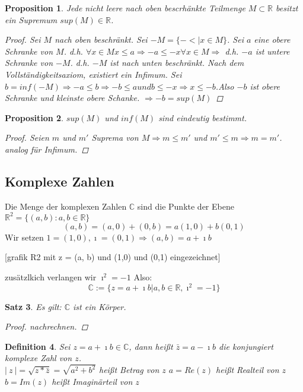 \documentclass[a4paper,titlepage,oneside]{article}
\def\C{\ensuremath{\mathbb{C}} }
\def\R{\ensuremath{\mathbb{R}} }
\def\im{\ensuremath{\imath} }
\newcommand{\fa}[1]{\ensuremath{\forall#1}}
\newcommand{\abs}[1]{\ensuremath{\left|\:#1\:\right|}}
\theoremstyle{thmstyle}
\newtheorem{satz}{Satz}[subsection]
\newtheorem{prop}[satz]{Proposition}
\newtheorem{defi}[satz]{Definition}
\begin{document}
\begin{prop}
Jede nicht leere nach oben bescrhänkte Teilmenge $M \subset \R$ besitzt ein Supremum $sup(M) \in \R$.
\begin{proof}
Sei $M$ nach oben beschränkt. Sei $-M = \{-< | x \in M\}$. Sei $a$ eine obere Schranke von $M$. d.h. $\fa x \in M  x \le a \Rightarrow -a \le -x \fa x \in M \Rightarrow $ d.h. $-a$ ist untere Schranke von $-M$. d.h. $-M$ ist nach unten beschränkt. Nach dem Vollständigkeitsaxiom, existiert ein Infimum. Sei $b= inf(-M) \Rightarrow -a \le b \Rightarrow -b \le a und b \le -x \Rightarrow x \le -b$.Also $-b$ ist obere Schranke und kleinste obere Schanke. $ \Rightarrow -b = sup(M)$ 
\end{proof}
\end{prop}

\begin{prop}
$sup(M)$ und $inf(M)$ sind eindeutig bestimmt.
\begin{proof}
Seien $m$ und $m'$ Suprema von $M \Rightarrow m \le m'$ und $m' \le m \Rightarrow m = m'$.\\
analog für Infimum.
\end{proof}
\end{prop}

\subsection{Komplexe Zahlen}
Die Menge der komplexen Zahlen \C sind die Punkte der Ebene \(\R^2 = \{(a,b) : a,b \in \R\}\)
\[(a,b) = (a, 0) + (0, b) = a (1,0) + b (0, 1)\]
Wir setzen \(1 = (1,0), \im = (0,1) \Rightarrow (a, b) = a + \im b\)

[grafik R2 mit z = (a, b) und (1,0) und (0,1) eingezeichnet]  %

zusätzlkich verlangen wir \(\im^2 = -1\) Also: \[\C := \{z = a + \im b | a, b \in \R, \im^2 = -1 \}\]

\begin{satz}
Es gilt:  \C ist ein Körper.
\begin{proof} nachrechnen. \end{proof} %
\end{satz}

\begin{defi}
Sei \( z = a + \im b \in \C \), dann heißt \(\bar{z} = a - \im b \) die konjungiert komplexe Zahl von $z$. \\
\(\abs{z} = \sqrt{z * \bar{z}} = \sqrt{a^2 + b^2}\) heißt Betrag von \(z\)
$a = Re(z)$ heißt Realteil von $z$
$b = Im(z)$ heißt Imaginärteil von $z$
\end{defi}
\end{document}
